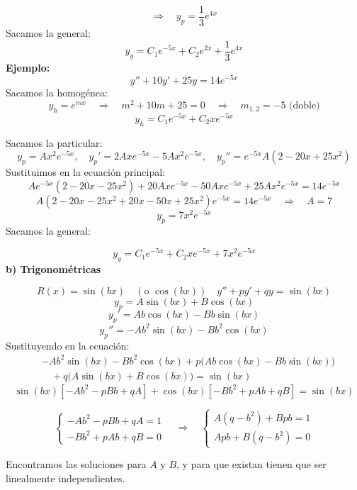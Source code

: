 \documentclass[a4paper,12pt]{article}
\begin{document}
\[
\Rightarrow \quad y_p = \frac{1}{3} e^{4x}
\]
Sacamos la general:
\vspace{0,5 em}
\[
y_g = C_1 e^{-5x} + C_2 e^{2x} + \frac{1}{3} e^{4x}
\]
\noindent
\textbf{Ejemplo:}
\vspace{0,7 em}
\[
y'' + 10y' + 25y = 14e^{-5x}
\]
Sacamos la homogénea:
\[
y_h = e^{mx}
\quad \Rightarrow \quad 
m^2 + 10m + 25 = 0 
\quad \Rightarrow \quad 
m_{1,2} = -5 \text{ (doble)}
\]
\[
y_h = C_1 e^{-5x} + C_2 x e^{-5x}
\]

\newpage
\noindent
Sacamos la particular:
\[
y_p = A x^2 e^{-5x}, 
\quad y_p' = 2A x e^{-5x} - 5A x^2 e^{-5x},
\quad y_p'' = e^{-5x} A(2 - 20x + 25x^2)
\]
Sustituimos en la ecuación principal:
\vspace{-0,2 em}
\[
A e^{-5x} (2 - 20x - 25x^2) + 20A x e^{-5x} - 50A x e^{-5x} + 25A x^2 e^{-5x} = 14 e^{-5x}
\]
\vspace{-1 em}
\[
A (2 - 20x - 25x^2 + 20x - 50x + 25x^2) e^{-5x} = 14 e^{-5x}
\quad \Rightarrow \quad A = 7
\]
\vspace{-0,3 em}
\[
y_p = 7x^2 e^{-5x}
\]
Sacamos la general:

\[
y_g = C_1 e^{-5x} + C_2 x e^{-5x} + 7x^2 e^{-5x}
\]
\noindent
\textbf{b) Trigonométricas}

\[
R(x) = \sin(bx) \quad (\text{o } \cos(bx)) \quad y'' + p y' + q y = \sin(bx)
\]
\vspace{-0,6 em}
\[
y_p = A \sin(bx) + B \cos(bx)
\]
\[
y_p' = A b \cos(bx) - B b \sin(bx)
\]
\[
y_p'' = -A b^2 \sin(bx) - B b^2 \cos(bx)
\]
\noindent
Sustituyendo en la ecuación:
\vspace{0,1 em}
\begin{align*}
& -A b^2 \sin(bx) - B b^2 \cos(bx) 
+ p \big(A b \cos(bx) - B b \sin(bx)\big) \nonumber \\
& \quad + q \big(A \sin(bx) + B \cos(bx)\big) 
= \sin(bx)
\end{align*}
\[
\sin(bx)[-A b^2 - p B b + q A] + \cos(bx)[-B b^2 + p A b + q B] = \sin(bx)
\]

\[
\begin{cases}
-A b^2 - p B b + q A = 1 \\
-B b^2 + p A b + q B = 0
\end{cases}
\quad \Rightarrow \quad
\begin{cases}
A (q - b^2) + B p b = 1 \\
A p b + B (q - b^2) = 0
\end{cases}
\]

\medskip
\noindent
Encontramos las soluciones para \(A\) y \(B\), y para que existan tienen que ser linealmente independientes.
\end{document}
